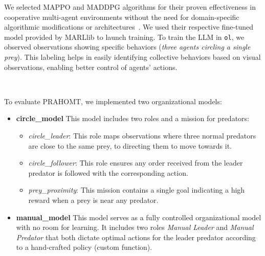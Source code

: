 \documentclass[runningheads]{llncs}
\theoremstyle{freethm}
\theoremstyle{proofoutline}
\begin{document}
\noindent We selected MAPPO and MADDPG algorithms for their proven effectiveness in cooperative multi-agent environments without the need for domain-specific algorithmic modifications or architectures~\cite{Yu2022}. We used their respective fine-tuned model provided by MARLlib to launch training.
%
To train the LLM in \texttt{ol}, we observed observations showing specific behaviors (\textit{three agents circling a single prey}). This labeling helps in easily identifying collective behaviors based on visual observations, enabling better control of agents' actions.

\

\noindent To evaluate PRAHOMT, we implemented two organizational models:

\begin{itemize}
    \item \textbf{circle\_model} \quad This model includes two roles and a mission for predators:
          \begin{itemize}
              \item \textit{circle\_leader}: This role maps observations where three normal predators are close to the same prey, to directing them to move towards it.
              \item \textit{circle\_follower}: This role ensures any order received from the leader predator is followed with the corresponding action.
              \item \textit{prey\_proximity}: This mission contains a single goal indicating a high reward when a prey is near any predator.
          \end{itemize}

    \item \textbf{manual\_model} \quad This model serves as a fully controlled organizational model with no room for learning. It includes two roles \textit{Manual Leader} and \textit{Manual Predator} that both dictate optimal actions for the leader predator according to a hand-crafted policy (custom function).
\end{itemize}
\end{document}
